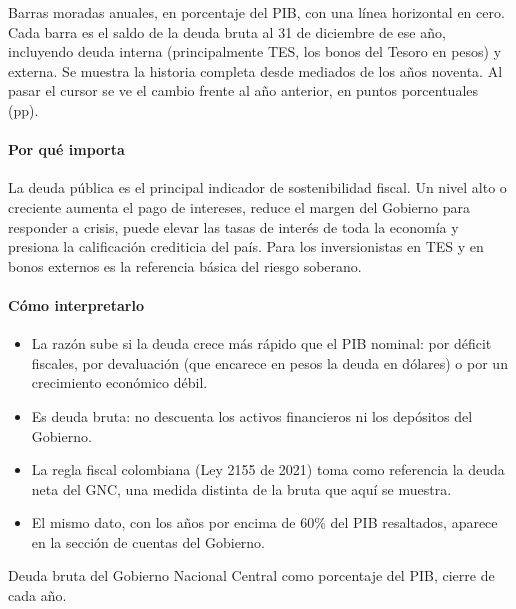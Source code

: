 \begin{leer}
Barras moradas anuales, en porcentaje del PIB, con una línea horizontal en cero. Cada barra es el saldo de la deuda bruta al 31 de diciembre de ese año, incluyendo deuda interna (principalmente TES, los bonos del Tesoro en pesos) y externa. Se muestra la historia completa desde mediados de los años noventa. Al pasar el cursor se ve el cambio frente al año anterior, en puntos porcentuales (pp).
\end{leer}

\paragraph{Por qué importa}
La deuda pública es el principal indicador de sostenibilidad fiscal. Un nivel alto o creciente aumenta el pago de intereses, reduce el margen del Gobierno para responder a crisis, puede elevar las tasas de interés de toda la economía y presiona la calificación crediticia del país. Para los inversionistas en TES y en bonos externos es la referencia básica del riesgo soberano.

\paragraph{Cómo interpretarlo}
\begin{itemize}
\item La razón sube si la deuda crece más rápido que el PIB nominal: por déficit fiscales, por devaluación (que encarece en pesos la deuda en dólares) o por un crecimiento económico débil.
\item Es deuda bruta: no descuenta los activos financieros ni los depósitos del Gobierno.
\item La regla fiscal colombiana (Ley 2155 de 2021) toma como referencia la deuda neta del GNC, una medida distinta de la bruta que aquí se muestra.
\item El mismo dato, con los años por encima de 60\% del PIB resaltados, aparece en la sección de cuentas del Gobierno.
\end{itemize}
\begin{formulas}[Fórmulas]
\end{formulas}
\begin{metodo}[Metodología]
Deuda bruta del Gobierno Nacional Central como porcentaje del PIB, cierre de cada año.
\par{}
\end{metodo}

